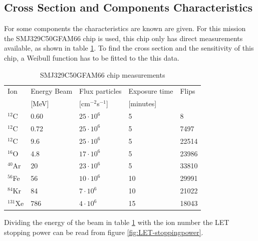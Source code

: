 \subsection{\label{subsec:CSCC}Cross Section and Components Characteristics}
For some components the  characteristics are known are given. For this mission the SMJ329C50GFAM66 chip is used, this chip only has direct measurements available, as shown in table \ref{tab:SMJ-LET}. To find the cross section and the sensitivity of this chip, a Weibull function has to be fitted to the this data.

\begin{table}[H]
\centering
\begin{tabular}{|l|l|l|l|l|}
\hline
Ion & Energy Beam & Flux particles & Exposure time & Flips \\
& [MeV] & [cm$^{-2}$s$^{-1}$] & [minutes] & \\\hline

$^{12}$C & 0.60 & $25 \cdot 10^6$ & 5 & 8\\\hline
$^{12}$C & 0.72 & $25 \cdot 10^6$ & 5 & 7497\\\hline
$^{12}$C & 9.6 & $25 \cdot 10^6$ & 5 & 22514\\\hline
$^{16}$O & 4.8 & $17 \cdot 10^6$ & 5 & 23986\\\hline
$^{40}$Ar & 20 & $23 \cdot 10^6$ & 5 & 33810\\\hline
$^{56}$Fe & 56 & $10 \cdot 10^6$ & 10 & 29991\\\hline
$^{84}$Kr & 84 & $7 \cdot 10^6$ & 10 & 21022\\\hline
$^{131}$Xe & 786 & $4 \cdot 10^6$ & 15 & 18043\\\hline

\end{tabular}
\caption{SMJ329C50GFAM66 chip measurements}
\label{tab:SMJ-LET}
\end{table}

Dividing the energy of the beam in table \ref{tab:SMJ-LET} with the ion number the LET stopping power can be read from figure \ref{fig:LET-stoppingpower}.

